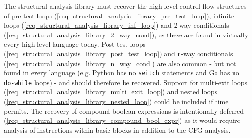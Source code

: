 The structural analysis library must recover the high-level control flow structures of pre-test loops (\ref{req_structural_analysis_library_pre_test_loop}), infinite loops (\ref{req_structural_analysis_library_inf_loop}) and 2-way conditionals (\ref{req_structural_analysis_library_2_way_cond}), as these are found in virtually every high-level language today. Post-test loops (\ref{req_structural_analysis_library_post_test_loop}) and n-way conditionals (\ref{req_structural_analysis_library_n_way_cond}) are also common - but not found in every language (e.g. Python has no \texttt{switch} statements and Go has no \texttt{do-while} loops) - and should therefore be recovered. Support for multi-exit loops (\ref{req_structural_analysis_library_multi_exit_loop}) and nested loops (\ref{req_structural_analysis_library_nested_loop}) could be included if time permits. The recovery of compound boolean expressions is intentionally deferred (\ref{req_structural_analysis_library_compound_bool_expr}) as it would require analysis of instructions within basic blocks in addition to the CFG analysis.

